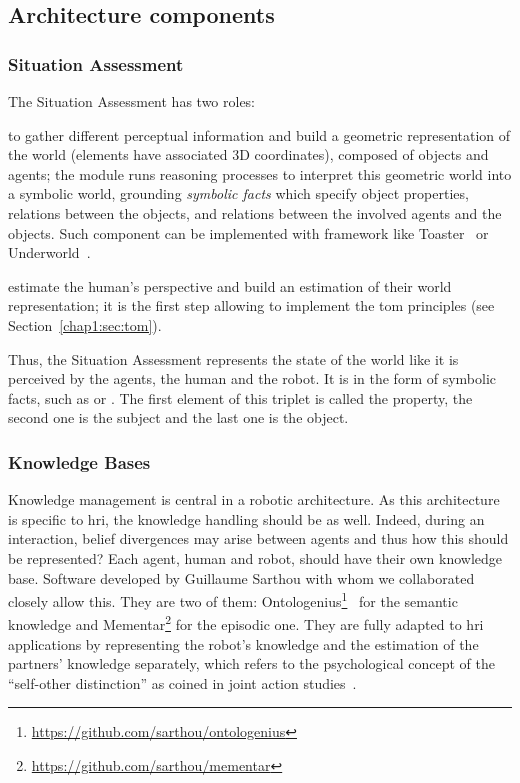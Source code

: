 \documentclass[a4paper,11pt,twoside]{StyleThese}
\begin{document}
\newpage

\subsection{Architecture components}

\subsubsection{Situation Assessment}\label{chap3:subsubsec:sa}
The Situation Assessment has two roles:
\begin{enumList}
	\item  to gather different perceptual information and build a geometric representation of the world (\ie elements have associated 3D coordinates), composed of objects and agents; the module runs reasoning processes to interpret this geometric world into a symbolic world, grounding \emph{symbolic facts} which specify object properties, relations between the objects, and relations between the involved agents and the objects. Such component can be implemented with framework like Toaster~\citep{milliez_2014_framework} or Underworld~\citep{lemaignan_2018_underworlds}.
	\item estimate the human's perspective and build an estimation of their world representation; it is the first step allowing to implement the \acrlong{tom} principles (see Section~\ref{chap1:sec:tom}).
\end{enumList}

Thus, the Situation Assessment represents the state of the world like it is perceived by the agents, the human and the robot. It is in the form of symbolic facts, such as  or . The first element of this triplet is called the property, the second one is the subject and the last one is the object.

\subsubsection{Knowledge Bases}\label{chap3:subsubsec:kb}

Knowledge management is central in a robotic architecture. As this architecture is specific to \acrshort{hri}, the knowledge handling should be as well. Indeed, during an interaction, belief divergences may arise between agents and thus how this should be represented? Each agent, human and robot, should have their own knowledge base. Software developed by Guillaume Sarthou with whom we collaborated closely allow this. They are two of them: Ontologenius\footnote{\url{https://github.com/sarthou/ontologenius}}~\citep{sarthou_2019_ontologenius} for the semantic knowledge and Mementar\footnote{\url{https://github.com/sarthou/mementar}} for the episodic one. They are fully adapted to \acrshort{hri} applications by representing the robot's knowledge and the estimation of the partners' knowledge separately, which refers to the psychological concept of the ``self-other distinction'' as coined in joint action studies~\citep{pacherie_2012_agency}.  
\end{document}
